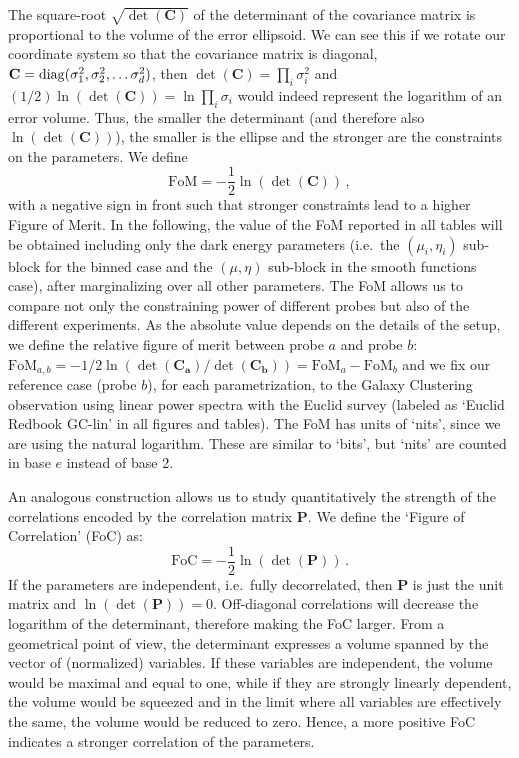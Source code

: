 The square-root $\sqrt{\det(\mathbf{C})}$ of the determinant of the covariance matrix is proportional to the volume of the error
ellipsoid. We can see this if we rotate our coordinate system so that the 
covariance matrix is diagonal, $\mathbf C = {\rm diag}(\sigma_1^2, \sigma_2^2, \ldots \sigma_{d}^{2})$, then $\det(\mathbf C) = \prod_i \sigma_i^2$ and $(1/2)\ln(\det(\mathbf C)) = \ln \prod_i\sigma_i$ would indeed represent the logarithm of an error volume. Thus, the smaller the determinant (and therefore also $\ln(\det(\mathbf{C}))$), the smaller is the ellipse and the stronger are the constraints on the parameters. We define
\begin{equation}\label{eq:FoM}
\mathrm{FoM} = -\frac{1}{2} \ln(\det(\mathbf{C})) \, ,
\end{equation}
with a negative sign in front such that stronger constraints lead to a higher Figure of Merit. In the following, the value of the FoM reported in all tables will be obtained including only the dark energy parameters (i.e.\ the $(\mu_i,\eta_i)$ sub-block for the binned case and the $(\mu,\eta)$ sub-block in the smooth functions case), after marginalizing over
all other parameters. 
The FoM allows us to compare not only the constraining power of different probes but also of the different experiments. 
As the absolute value depends on the details of the setup, we define the relative figure of merit between probe $a$ and probe $b$: $\mathrm{FoM}_{a,b} = -1/2 \ln(\det(\mathbf{C_a})/\det(\mathbf{C_b})) = \mathrm{FoM}_{a}-\mathrm{FoM}_{b}$ and we fix our reference case (probe $b$), for each parametrization, to the Galaxy Clustering observation using linear power spectra with the Euclid survey (labeled as `Euclid Redbook GC-lin' in all figures and tables). The FoM has units of `nits', since we are using the natural logarithm. These are similar to `bits', but `nits' are counted in base $e$ instead of base 2.

An analogous construction allows us to study quantitatively the strength of the correlations encoded by the correlation matrix $\mathbf P$.
We define the `Figure of Correlation' (FoC) as:
\begin{equation}\label{eq:FoC}
\mathrm{FoC} = -\frac{1}{2} \ln(\det(\mathbf{P})) \, .
\end{equation}
If the parameters are independent, i.e.\ fully decorrelated, then $\mathbf{P}$ is just the unit matrix and $\ln(\det(\mathbf{P}))=0$. 
Off-diagonal correlations will decrease the logarithm of the determinant, therefore making the FoC larger. 
From a geometrical point of view, the determinant expresses a volume spanned by the vector of (normalized) variables. 
If these variables are independent, the volume would be maximal and equal to one, while if they are strongly linearly dependent, the volume would be squeezed 
and in the limit where all variables are effectively the same, the volume would be reduced to zero. 
Hence, a more positive FoC indicates a stronger correlation of the parameters.


